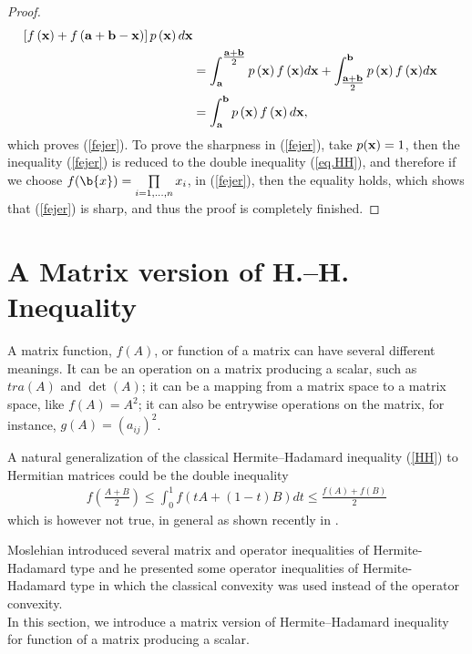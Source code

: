 \documentclass{amsart}
\theoremstyle{plain}
\numberwithin{equation}{section}
\begin{document}
\begin{proof}
\begin{align*}
{\left[ {f\left( {\bf{x}} \right) + f\left( {{\bf{a}} + {\bf{b}} -
{\bf{x}}} \right)} \right]p\left( {\bf{x}} \right)d{\bf{x}}}
\\
&=  \int_{\bf{a}}^{{\textstyle{{{\bf{a}} + {\bf{b}}} \over 2}}}
{{p\left( {\bf{x}} \right)f\left( {\bf{x}}
\right)}d{\bf{x}}}+\int_{{{\textstyle{{{\bf{a}} + {\bf{b}}} \over
2}}}}^{\bf{b}} {{p\left( {{\bf{x}}} \right)f\left( {\bf{x}}
\right)}d{\bf{x}}}
\\
&= \int_{\bf{a}}^{\bf{b}} {p\left( {\bf{x}} \right)f\left(
{\bf{x}} \right)d{\bf{x}}},
\end{align*}
which proves (\ref{fejer}). To prove the sharpness in
(\ref{fejer}), take $p({\bf{x}}) = 1$, then the inequality
(\ref{fejer}) is reduced to the double inequality (\ref{eq.HH}),
and therefore if we choose $f({\b{x}}) =  \prod\limits_{i = 1,
\ldots ,n} {x_i } $, in (\ref{fejer}), then the equality holds,
which shows that (\ref{fejer}) is sharp, and thus the proof is
completely finished.
\end{proof}

\section{A Matrix version of H.--H. Inequality}

A matrix function, $f(A)$, or function of a matrix can have
several different meanings. It can be an operation on a matrix
producing a scalar, such as $tra{(A)}$ and $\det{(A)}$; it can be
a mapping from a matrix space to a matrix space, like $f(A) =
A^2$; it can also be entrywise operations on the matrix, for
instance, $g(A) = (a_{ij})^2$.

A natural generalization of the classical Hermite--Hadamard
inequality (\ref{HH}) to Hermitian matrices could be the double
inequality
\begin{align}
\label{eq3.1}f\left( {\frac{{A + B}}{2}} \right) \le \int_0^1
{f\left( {tA + \left( {1 - t} \right)B} \right)dt}  \le
\frac{{f\left( A \right) + f\left( B \right)}}{2}
\end{align}
which is however not true, in general as shown recently in
\cite{Moslehian}.

Moslehian \cite{Moslehian} introduced several matrix and operator
inequalities of Hermite-Hadamard type and he presented some
operator inequalities of Hermite-Hadamard type in which the
classical convexity was used instead of the operator convexity.\\


In this section, we introduce a matrix version of
Hermite--Hadamard inequality for function of a matrix producing a
scalar.
\end{document}
